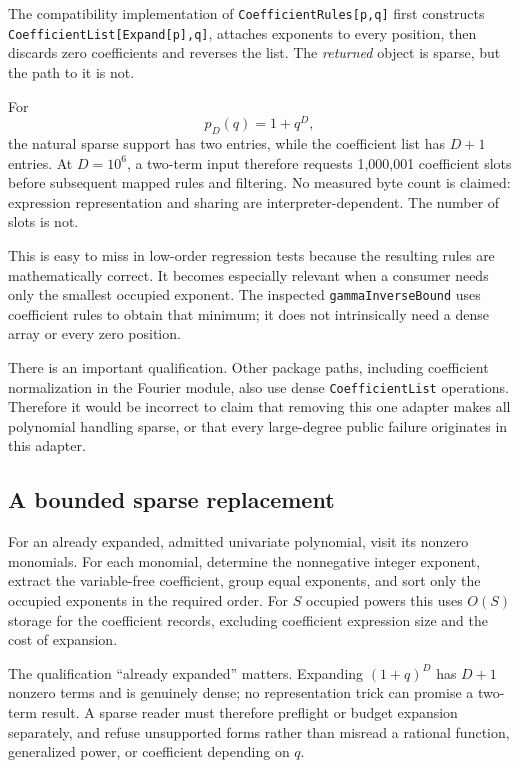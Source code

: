 \documentclass[11pt,letterpaper]{article}
\newcommand{\code}[1]{\nolinkurl{#1}}
\begin{document}
The compatibility implementation of \code{CoefficientRules[p,q]} first
constructs \code{CoefficientList[Expand[p],q]}, attaches exponents to every
position, then discards zero coefficients and reverses the list. The
\emph{returned} object is sparse, but the path to it is not.

For
\begin{equation}
 p_D(q)=1+q^D,
\end{equation}
the natural sparse support has two entries, while the coefficient list has
$D+1$ entries. At $D=10^6$, a two-term input therefore requests 1,000,001
coefficient slots before subsequent mapped rules and filtering. No measured
byte count is claimed: expression representation and sharing are
interpreter-dependent. The number of slots is not.

This is easy to miss in low-order regression tests because the resulting
rules are mathematically correct. It becomes especially relevant when a
consumer needs only the smallest occupied exponent. The inspected
\code{gammaInverseBound} uses coefficient rules to obtain that minimum;
it does not intrinsically need a dense array or every zero position.

There is an important qualification. Other package paths, including
coefficient normalization in the Fourier module, also use dense
\code{CoefficientList} operations. Therefore it would be incorrect to claim
that removing this one adapter makes all polynomial handling sparse, or
that every large-degree public failure originates in this adapter.
\cite{repo-fourier}

\subsection{A bounded sparse replacement}
For an already expanded, admitted univariate polynomial, visit its nonzero
monomials. For each monomial, determine the nonnegative integer exponent,
extract the variable-free coefficient, group equal exponents, and sort only
the occupied exponents in the required order. For $S$ occupied powers this
uses $O(S)$ storage for the coefficient records, excluding coefficient
expression size and the cost of expansion.

The qualification ``already expanded'' matters. Expanding $(1+q)^D$ has
$D+1$ nonzero terms and is genuinely dense; no representation trick can
promise a two-term result. A sparse reader must therefore preflight or
budget expansion separately, and refuse unsupported forms rather than
misread a rational function, generalized power, or coefficient depending
on $q$.
\end{document}
